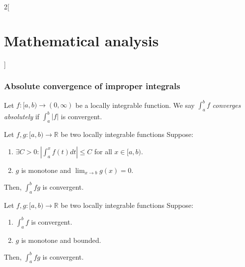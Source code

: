 \documentclass[class=article,crop=false]{standalone}
\begin{document}
\begin{multicols}{2}[\section{Mathematical analysis}]
\subsubsection{Absolute convergence of improper integrals}
\begin{definition}
Let $f:[a,b)\rightarrow(0,\infty)$ be a locally integrable function. We say $\displaystyle\int_a^b f$ \textit{converges absolutely} if  $\displaystyle\int_a^b |f|$ is convergent.
\end{definition}
\begin{theorem}
Let $f,g:[a,b)\rightarrow\mathbb{R}$ be two locally integrable functions Suppose:
\begin{enumerate}
    \item $\displaystyle\exists C>0: \left|\int_a^xf(t)dt\right|\leq C$ for all $x\in[a,b)$.
    \item $g$ is monotone and $\displaystyle\lim_{x\to b}g(x)=0$.
\end{enumerate}
Then, $\displaystyle\int_a^b fg$ is convergent.
\end{theorem}
\begin{theorem}
Let $f,g:[a,b)\rightarrow\mathbb{R}$ be two locally integrable functions Suppose:
\begin{enumerate}
    \item $\displaystyle\int_a^b f$ is convergent.
    \item $g$ is monotone and bounded.
\end{enumerate}
Then, $\displaystyle\int_a^b fg$ is convergent.
\end{theorem}

\end{multicols}
\end{document}
